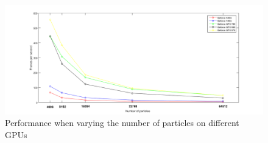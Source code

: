 \begin{figure}[H]
\hspace*{-2.1cm}
  \label{fig:graph}
  \centering
  \includegraphics[scale=0.5]{img/graph.png}
  \caption{Performance when varying the number of particles on different GPUs}
\end{figure}


